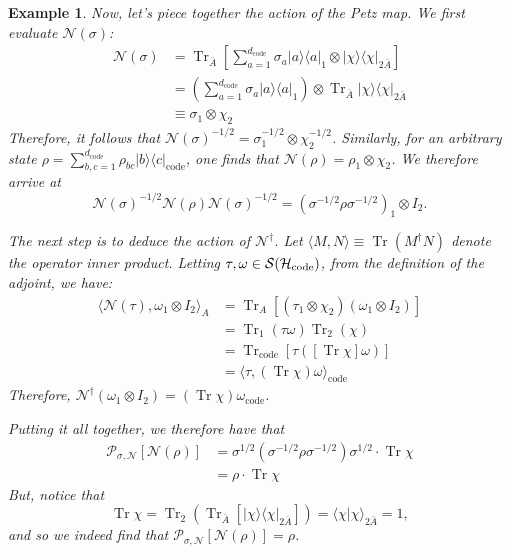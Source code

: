 \documentclass[a4paper,11pt]{article}
\newtheorem{example}[thm]{Example}
\newenvironment{eg}{\begin{example}  \rm  }{    \end{example} }
\DeclareMathOperator{\Tr}{Tr}
\newcommand{\braket}[2]{\langle #1|#2\rangle}
\newcommand{\ketbra}[2]{| #1 \rangle \langle #2 |}
\newcommand{\Hil}{{\cal H}}
\newcommand{\mrm}[1]{\mathrm{#1}}
\begin{document}
\begin{eg}
Now, let's piece together the action of the Petz map.
We first evaluate $\mathcal{N}(\sigma)$:
\begin{align*}
\mathcal{N}(\sigma) &= \Tr_{\bar{A}} \left[ \sum_{a=1}^{d_\mrm{code}} \sigma_a \ketbra{a}{a}_1 \otimes \ketbra{\chi}{\chi}_{2\bar{A}} \right] \\
&= \left( \sum_{a=1}^{d_\mrm{code}} \sigma_a \ketbra{a}{a}_1 \right) \otimes \Tr_{\bar{A}} \ketbra{\chi}{\chi}_{2\bar{A}} \\
&\equiv \sigma_1 \otimes \chi_2
\end{align*}
Therefore, it follows that $\mathcal{N}(\sigma)^{-1/2} = \sigma_1^{-1/2} \otimes \chi_2^{-1/2}$.
Similarly, for an arbitrary state $\rho = \sum_{b,c=1}^{d_\mrm{code}} \rho_{bc} \ketbra{b}{c}_\mrm{code}$, one finds that $\mathcal{N}(\rho) = \rho_1 \otimes \chi_2$.
We therefore arrive at
\begin{equation}
\mathcal{N}(\sigma)^{-1/2} \mathcal{N}(\rho) \mathcal{N}(\sigma)^{-1/2} = (\sigma^{-1/2} \rho \sigma^{-1/2})_1 \otimes I_2.
\end{equation}

The next step is to deduce the action of $\mathcal{N}^\dagger$.
Let $\langle M, N \rangle \equiv \Tr(M^\dagger N)$ denote the operator inner product.
Letting $\tau, \omega \in \mathcal{S}(\Hil_\mrm{code})$, from the definition of the adjoint, we have:
\begin{align*}
\langle \mathcal{N}(\tau), \omega_1 \otimes I_2 \rangle_A &= \Tr_A[(\tau_1 \otimes \chi_2)(\omega_1 \otimes I_2)] \\
&= \Tr_1(\tau \omega) \Tr_2(\chi) \\
&= \Tr_\mrm{code} \left[ \tau  \left([\Tr \chi] \omega \right)\right] \\
&= \langle \tau, (\Tr \chi) \omega \rangle_\mrm{code}
\end{align*}
Therefore, $\mathcal{N}^\dagger(\omega_1 \otimes I_2) = (\Tr \chi) \omega_\mrm{code}$.

Putting it all together, we therefore have that
\begin{equation}
\begin{aligned}
\mathcal{P}_{\sigma, \mathcal{N}}[ \mathcal{N}(\rho) ] &= \sigma^{1/2} (\sigma^{-1/2} \rho \sigma^{-1/2})\sigma^{1/2} \cdot \Tr \chi \\
&= \rho \cdot \Tr \chi
\end{aligned}
\end{equation}
But, notice that
\begin{equation}
\Tr \chi = \Tr_2( \Tr_{\bar{A}} [\ketbra{\chi}{\chi}_{2\bar{A}}] ) = \braket{\chi}{\chi}_{2\bar{A}} = 1,
\end{equation}
and so we indeed find that $\mathcal{P}_{\sigma, \mathcal{N}}[ \mathcal{N}(\rho) ] = \rho$.


\end{eg}
\end{document}
